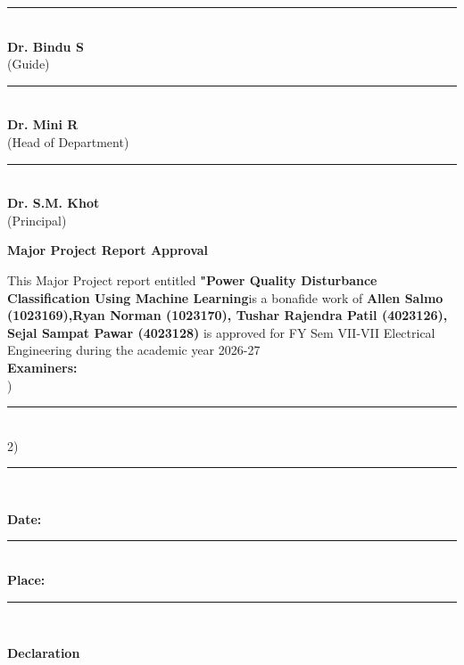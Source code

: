 \documentclass[12pt]{article}
\begin{document}
\begin{center}
\vspace*{2cm}

\begin{center}
\rule{8cm}{0.4pt} \\[0.2cm]
\textbf{Dr. Bindu S} \\[0.2cm]
(Guide)
\end{center}

\vspace{5cm}

\noindent
\begin{minipage}[t]{0.45\textwidth}
\centering
\rule{6cm}{0.4pt} \\[0.2cm]
\textbf{Dr. Mini R} \\[0.2cm]
(Head of Department)
\end{minipage}
\hfill
\begin{minipage}[t]{0.45\textwidth}
\centering
\rule{6cm}{0.4pt} \\[0.2cm]
\textbf{Dr. S.M. Khot} \\[0.2cm]
(Principal)
\end{minipage}
\clearpage

\begin{center}
    \vspace{2cm}
    \textbf{\LARGE Major Project Report Approval}\\[2cm]
\end{center}
\raggedright
\justifying
This Major Project report entitled \textbf{"Power Quality Disturbance Classification Using Machine Learning}is a bonafide work of \textbf{Allen Salmo (1023169),Ryan Norman (1023170), Tushar Rajendra Patil (4023126), Sejal Sampat Pawar (4023128)} is approved for FY Sem VII-VII Electrical Engineering during the academic year 2026-27\\[4cm]


\hspace{10.5cm}\textbf{Examiners:}\\

)\rule{5cm}{0.4pt}\\
\vspace{1cm}
2)\rule{5cm}{0.4pt}\\


\raggedright
\vspace{4cm}
\textbf{Date:}\rule{5cm}{0.4pt}\\
\vspace{1cm}
\textbf{Place:}\rule{5cm}{0.4pt}\\
\clearpage

\begin{center}
    \vspace{2cm}
    \textbf{\LARGE Declaration}\\[2cm]
\end{center}


\end{center}
\end{document}
